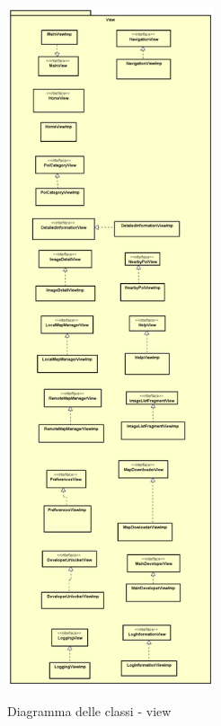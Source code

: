 \documentclass[../DefinizioneDiProdotto.tex]{subfiles}
\begin{document}
\begin{figure}[H]
\centering
\includegraphics[height=20cm]{diagrams/ModelCompleteNoMethods/PNGpackage/view}
\label{viewPackage}
\caption{Diagramma delle classi - view}
\end{figure}
\end{document}
